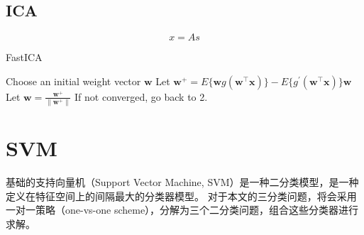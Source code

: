 \subsection{ICA}

\begin{equation}
	x=As
\end{equation}

\begin{algorithm}[h]
	\caption{FastICA}
	Choose an initial weight vector $\mathbf{w}$\;
	Let $\mathbf{w}^+=E\{\mathbf{w}g(\mathbf{w^\top x})\} - E\{g^\prime (\mathbf{w^\top x})\}\mathbf{w}$\;
	Let $\mathbf{w}=\frac{\mathbf{w}^+}{\lVert\mathbf{w}^+\rVert}$\;
	If not converged, go back to 2.
\end{algorithm}

\section{SVM}


基础的支持向量机（Support Vector Machine, SVM）是一种二分类模型，是一种定义在特征空间上的间隔最大的分类器模型。
对于本文的三分类问题，将会采用一对一策略（one-vs-one scheme），分解为三个二分类问题，组合这些分类器进行求解。

